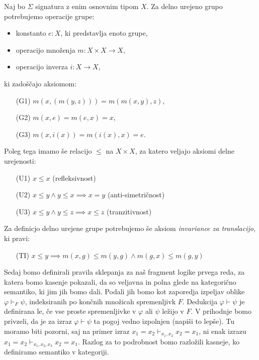 \documentclass[../kategoricna_logika.tex]{subfiles}
\begin{document}
\begin{primer}
  Naj bo $\Sigma$ signatura z enim osnovnim tipom $X$. Za delno urejeno grupo potrebujemo operacije grupe:
  \begin{itemize}
    \item konstanto $e : X$, ki predstavlja enoto grupe,
    \item operacijo množenja $m : X \times X \to X$,
    \item operacijo inverza $i : X \to X$,
  \end{itemize}
  ki zadoščajo aksiomom:
  \begin{itemize}
    \item[(G1)] $m(x,(m(y,z))) = m(m(x,y), z)$,
    \item[(G2)] $m(x,e) = m(e,x) = x$,
    \item[(G3)] $m(x,i(x)) = m(i(x), x) = e$.
  \end{itemize}
  Poleg tega imamo še relacijo $\leq$ na $X \times X$, za katero veljajo aksiomi delne urejenosti:
  \begin{itemize}
    \item[(U1)] $x \leq x$ (refleksivnost)
    \item[(U2)] $x \leq y \wedge y \leq x \implies x = y$ (anti-simetričnost)
    \item[(U3)] $x \leq y \wedge y \leq z \implies x \leq z$ (tranzitivnost)
  \end{itemize}
  Za definicjo delno urejene grupe potrebujemo še aksiom \emph{invariance za translacijo},
  ki pravi:
  \begin{itemize}
    \item[(TI)] $x \leq y \implies m(x, g) \leq m(y, g) \wedge m(g,x) \leq m(g,y)$
  \end{itemize}
\end{primer}

Sedaj bomo definirali pravila sklepanja za naš fragment logike prvega reda, 
za katera bomo kasenje pokazali, da so veljavna in polna glede na kategorično semantiko,
ki jim jih bomo dali.
Podali jih bomo kot zaporedja izpeljav oblike $\varphi \vdash_F \psi$, indeksiranih po končnih množicah spremenljivk $F$. Dedukcija $\varphi \vdash \psi$ je definirana le, če vse proste spremenljivke v $\varphi$ ali $\psi$ ležijo v $F$. V prihodnje bomo privzeli, da je za izraz $\varphi \vdash \psi$ ta pogoj vedno izpolnjen (napiši to lepše).
Tu moramo biti pozorni, saj na primer izraz $x_1 = x_2 \vdash_{x_1, x_2} x_2 = x_1$,
ni enak izrazu $x_1 = x_2 \vdash_{x_1, x_2, x_3} x_2 = x_1$.
Razlog za to podrobnost bomo razložili kasneje, ko definiramo semantiko v kategoriji.
\end{document}
